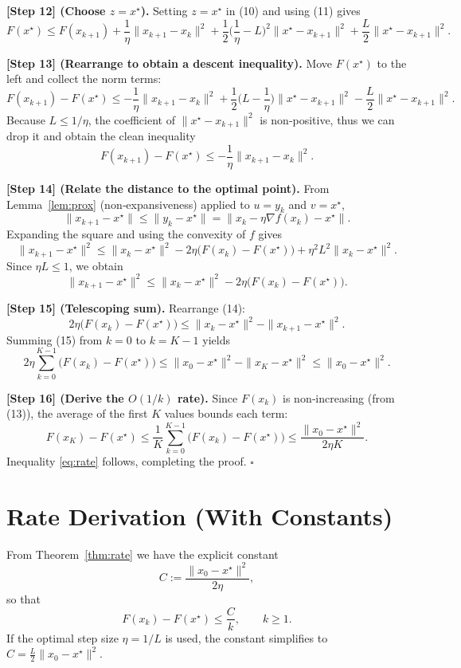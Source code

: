 \documentclass{article}
\begin{document}
\noindent\textbf{[Step 12] (Choose $z=x^{\star}$).}  
Setting $z=x^{\star}$ in (10) and using (11) gives
\[
F(x^{\star})\le F(x_{k+1})+\frac{1}{\eta}\|x_{k+1}-x_{k}\|^{2}
+\frac{1}{2}\Big(\frac{1}{\eta}-L\Big)^{2}\|x^{\star}-x_{k+1}\|^{2}
+\frac{L}{2}\|x^{\star}-x_{k+1}\|^{2}.
\tag{12}
\]

\noindent\textbf{[Step 13] (Rearrange to obtain a descent inequality).}  
Move $F(x^{\star})$ to the left and collect the norm terms:
\[
F(x_{k+1})-F(x^{\star})
\le -\frac{1}{\eta}\|x_{k+1}-x_{k}\|^{2}
+\frac{1}{2}\Big(L-\frac{1}{\eta}\Big)\|x^{\star}-x_{k+1}\|^{2}
-\frac{L}{2}\|x^{\star}-x_{k+1}\|^{2}.
\]
Because $L\le 1/\eta$, the coefficient of $\|x^{\star}-x_{k+1}\|^{2}$ is non‑positive, thus we can drop it and obtain the clean inequality
\[
F(x_{k+1})-F(x^{\star})\le -\frac{1}{\eta}\|x_{k+1}-x_{k}\|^{2}.
\tag{13}
\]

\noindent\textbf{[Step 14] (Relate the distance to the optimal point).}  
From Lemma~\ref{lem:prox} (non‑expansiveness) applied to $u=y_{k}$ and $v=x^{\star}$,
\[
\|x_{k+1}-x^{\star}\|\le\|y_{k}-x^{\star}\|
 =\|x_{k}-\eta\nabla f(x_{k})-x^{\star}\|.
\]
Expanding the square and using the convexity of $f$ gives
\[
\|x_{k+1}-x^{\star}\|^{2}\le\|x_{k}-x^{\star}\|^{2}
-2\eta\bigl(F(x_{k})-F(x^{\star})\bigr)+\eta^{2}L^{2}\|x_{k}-x^{\star}\|^{2}.
\]
Since $\eta L\le1$, we obtain
\[
\|x_{k+1}-x^{\star}\|^{2}\le\|x_{k}-x^{\star}\|^{2}
-2\eta\bigl(F(x_{k})-F(x^{\star})\bigr).
\tag{14}
\]

\noindent\textbf{[Step 15] (Telescoping sum).}  
Rearrange (14):
\[
2\eta\bigl(F(x_{k})-F(x^{\star})\bigr)\le
\|x_{k}-x^{\star}\|^{2}-\|x_{k+1}-x^{\star}\|^{2}.
\tag{15}
\]
Summing (15) from $k=0$ to $k=K-1$ yields
\[
2\eta\sum_{k=0}^{K-1}\bigl(F(x_{k})-F(x^{\star})\bigr)
\le\|x_{0}-x^{\star}\|^{2}-\|x_{K}-x^{\star}\|^{2}
\le\|x_{0}-x^{\star}\|^{2}.
\tag{16}
\]

\noindent\textbf{[Step 16] (Derive the $O(1/k)$ rate).}  
Since $F(x_{k})$ is non‑increasing (from (13)), the average of the first $K$ values bounds each term:
\[
F(x_{K})-F(x^{\star})\le\frac{1}{K}\sum_{k=0}^{K-1}\bigl(F(x_{k})-F(x^{\star})\bigr)
\le\frac{\|x_{0}-x^{\star}\|^{2}}{2\eta K}.
\tag{17}
\]
Inequality \eqref{eq:rate} follows, completing the proof. $\square$

\section*{Rate Derivation (With Constants)}
From Theorem~\ref{thm:rate} we have the explicit constant
\[
C:=\frac{\|x_{0}-x^{\star}\|^{2}}{2\eta},
\]
so that
\[
F(x_{k})-F(x^{\star})\le \frac{C}{k},\qquad k\ge1.
\]
If the optimal step size $\eta=1/L$ is used, the constant simplifies to $C= \frac{L}{2}\|x_{0}-x^{\star}\|^{2}$.
\end{document}
